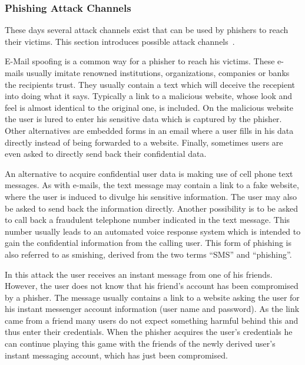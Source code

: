 \subsubsection{Phishing Attack Channels}
These days several attack channels exist that can be used by phishers to reach their victims.
 This section introduces possible attack channels~\cite{phishing2010ramazan, phishingtechniques}.
\label{s:attack_channels}
\begin{description}[leftmargin=0cm]
	\item[E-Mail] E-Mail spoofing is a common way for a phisher to reach his victims.
 These e-mails usually imitate renowned institutions, organizations, companies or banks the recipients trust.
 They usually contain a text which will deceive the recepient into doing what it says.
 Typically a link to a malicious website, whose look and feel is almost identical to the original one, is included.
 On the malicious website the user is lured to enter his sensitive data which is captured by the phisher.
 Other alternatives are embedded forms in an email where a user fills in his data directly instead of being forwarded to a website.
 Finally, sometimes users are even asked to directly send back their confidential data.

	\item[SMS] An alternative to acquire confidential user data is making use of cell phone text messages.
 As with e-mails, the text message may contain a link to a fake website, where the user is induced to divulge his sensitive information.
 The user may also be asked to send back the information directly.
 Another possibility is to be asked to call back a fraudulent telephone number indicated in the text message.
 This number usually leads to an automated voice response system which is intended to gain the confidential information from the calling user.
 This form of phishing is also referred to as smishing, derived from the two terms ``SMS'' and ``phishing''.
	\item[Instant Messaging] In this attack the user receives an instant message from one of his friends.
 However, the user does not know that his friend's account has been compromised by a phisher.
 The message usually contains a link to a website asking the user for his instant messenger account information (user name and password). As the link came from a friend many users do not expect something harmful behind this and thus enter their credentials.
 When the phisher acquires the user's credentials he can continue playing this game with the friends of the newly derived user's instant messaging account, which has just been compromised.


\end{description}

